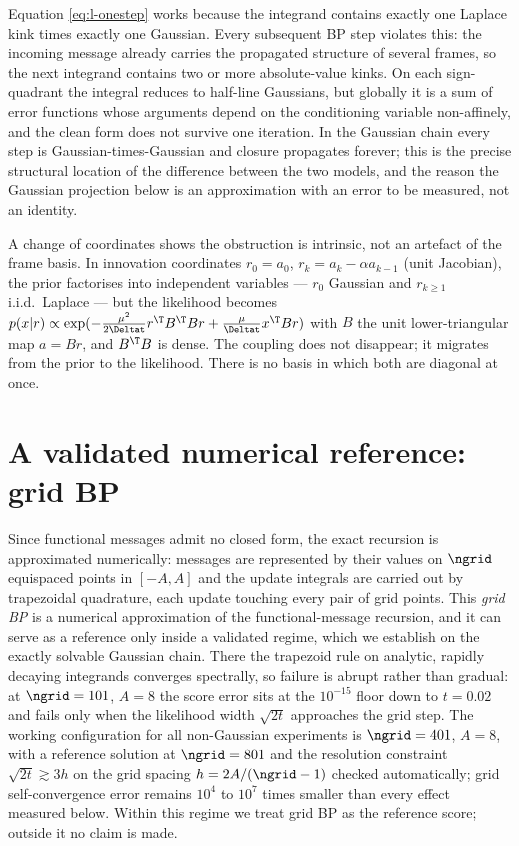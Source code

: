 \begin{remark}\label{rmk:l-breakdown}
Equation \eqref{eq:l-onestep} works because the integrand contains
exactly one Laplace kink times exactly one Gaussian. Every subsequent BP
step violates this: the incoming message already carries the propagated
structure of several frames, so the next integrand contains two or more
absolute-value kinks. On each sign-quadrant the integral reduces to
half-line Gaussians, but globally it is a sum of error functions whose
arguments depend on the conditioning variable non-affinely, and the clean
form does not survive one iteration. In the Gaussian chain every step is
Gaussian-times-Gaussian and closure propagates forever; this is the
precise structural location of the difference between the two models, and
the reason the Gaussian projection below is an approximation with an
error to be measured, not an identity.
\end{remark}

A change of coordinates shows the obstruction is intrinsic, not an
artefact of the frame basis. In innovation coordinates $r_0 = a_0$,
$r_k = a_k - \alpha a_{k-1}$ (unit Jacobian), the prior factorises into
independent variables --- $r_0$ Gaussian and $r_{k\geq1}$ i.i.d.\
Laplace --- but the likelihood becomes
$p(x|r) \propto \exp(-\tfrac{\mu^2}{2\Deltat} r^\T B^\T B r
+ \tfrac{\mu}{\Deltat} x^\T B r)$ with $B$ the unit lower-triangular
map $a = Br$, and $B^\T B$ is dense. The coupling does not disappear; it
migrates from the prior to the likelihood. There is no basis in which
both are diagonal at once.

\section{A validated numerical reference: grid BP}\label{sec:l-grid}

Since functional messages admit no closed form, the exact recursion is
approximated numerically: messages are represented by their values on $\ngrid$
equispaced points in $[-A, A]$ and the update integrals are carried out
by trapezoidal quadrature, each update touching every pair of grid
points. This
\emph{grid BP} is a numerical approximation of the functional-message
recursion, and it can serve as a reference only inside a validated
regime, which we establish on the exactly solvable Gaussian chain. There
the trapezoid rule on analytic, rapidly decaying integrands converges
spectrally, so failure is abrupt rather than gradual: at $\ngrid = 101$,
$A = 8$ the score error sits at the $10^{-15}$ floor down to $t = 0.02$
and fails only when the likelihood width $\sqrt{2t}$ approaches the grid
step. The working configuration for all non-Gaussian experiments is
$\ngrid = 401$, $A = 8$, with a reference solution at $\ngrid = 801$ and the
resolution constraint $\sqrt{2t} \gtrsim 3h$ on the grid spacing
$h = 2A/(\ngrid-1)$ checked automatically;
grid self-convergence error remains $10^4$ to $10^7$ times smaller than
every effect measured below. Within this regime we treat grid BP as the
reference score; outside it no claim is made.

